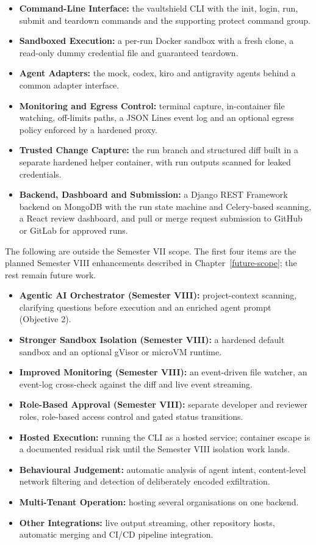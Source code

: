 \documentclass[12pt,a4paper,oneside]{report}
\providecommand{\tightlist}{\setlength{\itemsep}{0pt}\setlength{\parskip}{0pt}}
\begin{document}
\begin{itemize}
\tightlist
\item
  \textbf{Command-Line Interface:} the vaultshield CLI with the init, login, run, submit and teardown commands and the supporting protect command group.
\item
  \textbf{Sandboxed Execution:} a per-run Docker sandbox with a fresh clone, a read-only dummy credential file and guaranteed teardown.
\item
  \textbf{Agent Adapters:} the mock, codex, kiro and antigravity agents behind a common adapter interface.
\item
  \textbf{Monitoring and Egress Control:} terminal capture, in-container file watching, off-limits paths, a JSON Lines event log and an optional egress policy enforced by a hardened proxy.
\item
  \textbf{Trusted Change Capture:} the run branch and structured diff built in a separate hardened helper container, with run outputs scanned for leaked credentials.
\item
  \textbf{Backend, Dashboard and Submission:} a Django REST Framework backend on MongoDB with the run state machine and Celery-based scanning, a React review dashboard, and pull or merge request submission to GitHub or GitLab for approved runs.
\end{itemize}

The following are outside the Semester VII scope. The first four items are the planned Semester VIII enhancements described in Chapter~\ref{future-scope}; the rest remain future work.

\begin{itemize}
\tightlist
\item
  \textbf{Agentic AI Orchestrator (Semester VIII):} project-context scanning, clarifying questions before execution and an enriched agent prompt (Objective 2).
\item
  \textbf{Stronger Sandbox Isolation (Semester VIII):} a hardened default sandbox and an optional gVisor or microVM runtime.
\item
  \textbf{Improved Monitoring (Semester VIII):} an event-driven file watcher, an event-log cross-check against the diff and live event streaming.
\item
  \textbf{Role-Based Approval (Semester VIII):} separate developer and reviewer roles, role-based access control and gated status transitions.
\item
  \textbf{Hosted Execution:} running the CLI as a hosted service; container escape is a documented residual risk until the Semester VIII isolation work lands.
\item
  \textbf{Behavioural Judgement:} automatic analysis of agent intent, content-level network filtering and detection of deliberately encoded exfiltration.
\item
  \textbf{Multi-Tenant Operation:} hosting several organisations on one backend.
\item
  \textbf{Other Integrations:} live output streaming, other repository hosts, automatic merging and CI/CD pipeline integration.
\end{itemize}
\end{document}

